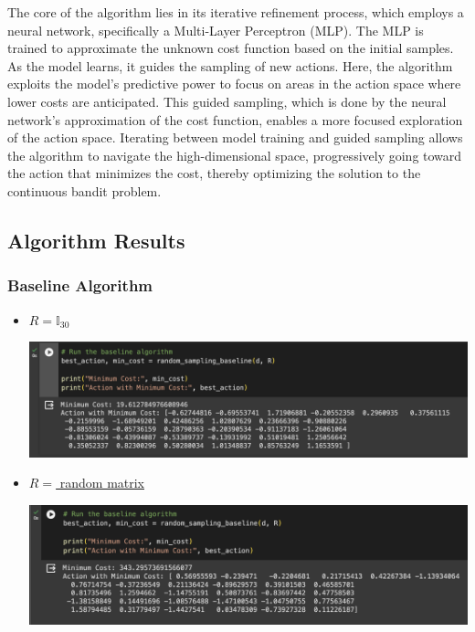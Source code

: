 \documentclass{article}
\begin{document}
The core of the algorithm lies in its iterative refinement process, which employs a neural network, specifically a Multi-Layer Perceptron (MLP).
The MLP is trained to approximate the unknown cost function based on the initial samples. 
As the model learns, it guides the sampling of new actions. Here, the algorithm exploits the model's predictive power to focus on areas in the action space where lower costs are anticipated. 
This guided sampling, which is done by the neural network's approximation of the cost function, enables a more focused exploration of the action space. 
Iterating between model training and guided sampling allows the algorithm to navigate the high-dimensional space, progressively going toward the action that minimizes the cost, thereby optimizing the solution to the continuous bandit problem.

\subsection*{Algorithm Results}
\subsubsection*{Baseline Algorithm}
\begin{itemize}
    \item \underline{$R = \mathbb{I}_{30}$}\par
    \includegraphics[scale=0.5]{BI.png}
    \item \underline{$R= $ random matrix}\par
    \includegraphics[scale=0.5]{BR.png}
\end{itemize}
\end{document}
